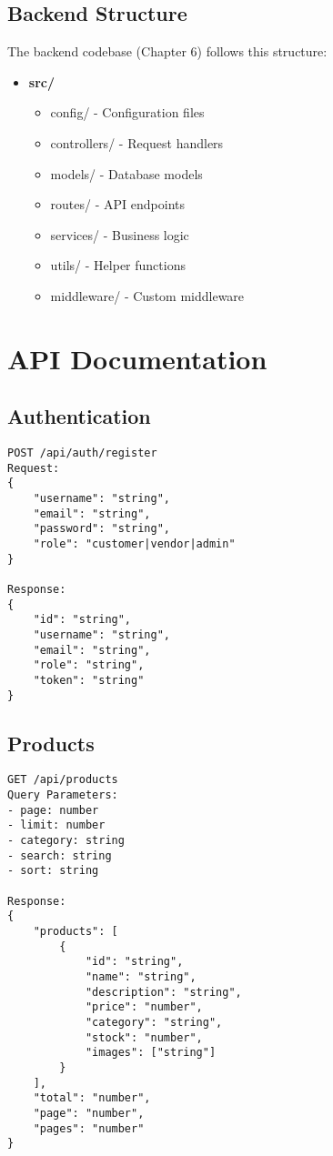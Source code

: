 \subsection{Backend Structure}
The backend codebase (Chapter 6) follows this structure:
\begin{itemize}
    \item \textbf{src/}
    \begin{itemize}
        \item config/ - Configuration files
        \item controllers/ - Request handlers
        \item models/ - Database models
        \item routes/ - API endpoints
        \item services/ - Business logic
        \item utils/ - Helper functions
        \item middleware/ - Custom middleware
    \end{itemize}
\end{itemize}

\section{API Documentation}
\subsection{Authentication}
\begin{verbatim}
POST /api/auth/register
Request:
{
    "username": "string",
    "email": "string",
    "password": "string",
    "role": "customer|vendor|admin"
}

Response:
{
    "id": "string",
    "username": "string",
    "email": "string",
    "role": "string",
    "token": "string"
}
\end{verbatim}

\subsection{Products}
\begin{verbatim}
GET /api/products
Query Parameters:
- page: number
- limit: number
- category: string
- search: string
- sort: string

Response:
{
    "products": [
        {
            "id": "string",
            "name": "string",
            "description": "string",
            "price": "number",
            "category": "string",
            "stock": "number",
            "images": ["string"]
        }
    ],
    "total": "number",
    "page": "number",
    "pages": "number"
}
\end{verbatim}

